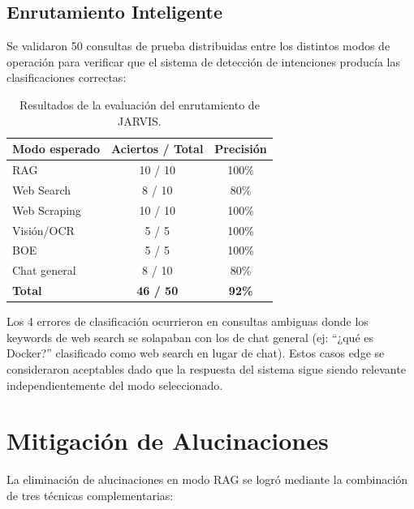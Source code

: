 \subsection{Enrutamiento Inteligente}

Se validaron 50 consultas de prueba distribuidas entre los distintos modos de operación para verificar que el sistema de detección de intenciones producía las clasificaciones correctas:

\begin{table}[H]
\centering
\caption{Resultados de la evaluación del enrutamiento de JARVIS.}
\label{tab:enrutamiento-eval}
\begin{tabular}{lcc}
\toprule
\textbf{Modo esperado} & \textbf{Aciertos / Total} & \textbf{Precisión} \\
\midrule
RAG           & 10 / 10 & 100\% \\
Web Search    & 8 / 10  & 80\% \\
Web Scraping  & 10 / 10 & 100\% \\
Visión/OCR    & 5 / 5   & 100\% \\
BOE           & 5 / 5   & 100\% \\
Chat general  & 8 / 10  & 80\% \\
\midrule
\textbf{Total} & \textbf{46 / 50} & \textbf{92\%} \\
\bottomrule
\end{tabular}
\end{table}

Los 4 errores de clasificación ocurrieron en consultas ambiguas donde los keywords de web search se solapaban con los de chat general (ej: ``¿qué es Docker?'' clasificado como web search en lugar de chat). Estos casos edge se consideraron aceptables dado que la respuesta del sistema sigue siendo relevante independientemente del modo seleccionado.

\section{Mitigación de Alucinaciones}

La eliminación de alucinaciones en modo RAG se logró mediante la combinación de tres técnicas complementarias:

